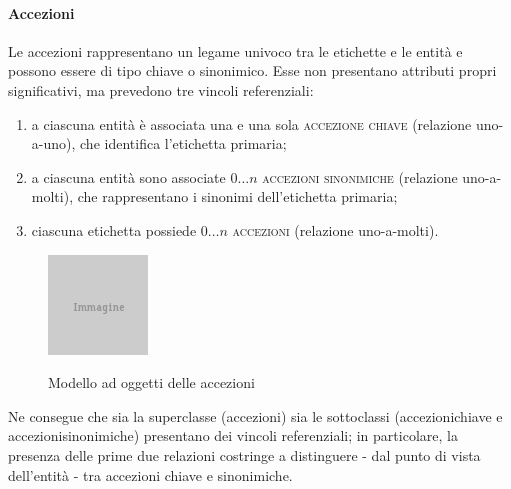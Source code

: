 \paragraph{Accezioni}
Le accezioni rappresentano un legame univoco tra le etichette e le entità e possono essere di tipo chiave o sinonimico. Esse non presentano attributi propri significativi, ma prevedono tre vincoli referenziali:
\begin{enumerate}
\item a ciascuna entità è associata una e una sola \textsc{accezione chiave} (relazione uno-a-uno), che identifica l'etichetta primaria;
\item a ciascuna entità sono associate $0\ldots n$ \textsc{accezioni sinonimiche} (relazione uno-a-molti), che rappresentano i sinonimi dell'etichetta primaria;
\item ciascuna etichetta possiede $0\ldots n$ \textsc{accezioni} (relazione uno-a-molti).
\end{enumerate}

\begin{figure}[ht]
\begin{center}
\includegraphics{placeholder.png}
\label{fig:tesi:stage:er:accezioni}
\caption{Modello ad oggetti delle accezioni}
\end{center}
\end{figure}

Ne consegue che sia la superclasse (\textsf{accezioni}) sia le sottoclassi (\textsf{accezioni\textunderscore chiave} e \textsf{accezioni\textunderscore sinonimiche}) presentano dei vincoli referenziali; in particolare, la presenza delle prime due relazioni costringe a distinguere - dal punto di vista dell'entità - tra accezioni chiave e sinonimiche.

